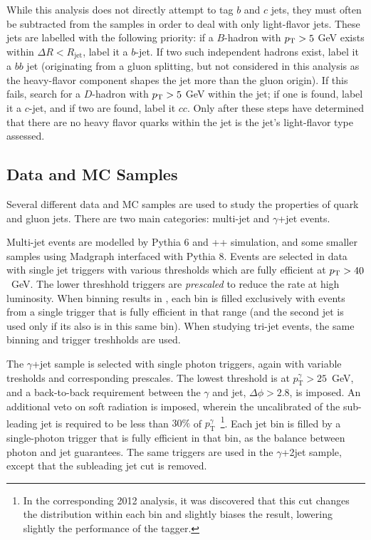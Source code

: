While this analysis does not directly attempt to tag $b$ and $c$ jets, they must often be subtracted from the samples in order to deal with only light-flavor jets. These jets are labelled with the following priority: if a $B$-hadron with $p_{\text{T}} > 5$ GeV exists within $\Delta R < R_\mathrm{jet}$, label it a $b$-jet. If two such independent hadrons exist, label it a $bb$ jet (originating from a gluon splitting, but not considered in this analysis as the heavy-flavor component shapes the jet more than the gluon origin). If this fails, search for a $D$-hadron with $p_{\text{T}} > 5$ GeV within the jet; if one is found, label it a $c$-jet, and if two are found, label it $cc$. Only after these steps have determined that there are no heavy flavor quarks within the jet is the jet's light-flavor type assessed.

\subsection{Data and MC Samples}
\label{jet-reconstruction:qg:samples}

Several different data and MC samples are used to study the properties of quark and gluon jets. There are two main categories: multi-jet and $\gamma$+jet events. 

Multi-jet events are modelled by {\sc Pythia 6} and \Herwig++ simulation, and some smaller samples using {\sc Madgraph} interfaced with {\sc Pythia 8}. Events are selected in data with single jet triggers with various thresholds which are fully efficient at $p_{\text{T}} > 40$~GeV. The lower \pt threshhold triggers are \textit{prescaled} to reduce the rate at high luminosity. When binning results in \pt, each bin is filled exclusively with events from a single trigger that is fully efficient in that range (and the second jet is used only if its \pt also is in this same bin). When studying tri-jet events, the same \pt binning and trigger treshholds are used.

The $\gamma$+jet sample is selected with single photon triggers, again with variable tresholds and corresponding prescales. The lowest threshold is at $p_\mathrm{T}^\gamma > 25$~GeV, and a back-to-back requirement between the $\gamma$ and jet, $\Delta \phi > 2.8$, is imposed. An additional veto on soft radiation is imposed, wherein the uncalibrated \pt of the sub-leading jet is required to be less than $30\%$ of $p_\mathrm{T}^\gamma$~\cite{JES2010}\footnote{In the corresponding 2012 analysis, it was discovered that this cut changes the \pt distribution within each \pt bin and slightly biases the result, lowering slightly the performance of the tagger.}. Each jet \pt bin is filled by a single-photon trigger that is fully efficient in that bin, as the balance between photon and jet guarantees. The same triggers are used in the $\gamma$+2jet sample, except that the subleading jet \pt cut is removed.

